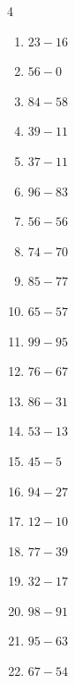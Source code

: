 \begin{multicols}{4}
\begin{enumerate}
  \item $23-16$
        \phantom{$=7$}

  \item $56-0$
        \phantom{$=56$}

  \item $84-58$
        \phantom{$=26$}

  \item $39-11$
        \phantom{$=28$}

  \item $37-11$
        \phantom{$=26$}

  \item $96-83$
        \phantom{$=13$}

  \item $56-56$
        \phantom{$=0$}

  \item $74-70$
        \phantom{$=4$}

  \item $85-77$
        \phantom{$=8$}

  \item $65-57$
        \phantom{$=8$}

  \item $99-95$
        \phantom{$=4$}

\columnbreak %

  \item $76-67$
        \phantom{$=9$}

  \item $86-31$
        \phantom{$=55$}

  \item $53-13$
        \phantom{$=40$}

  \item $45-5$
        \phantom{$=40$}

  \item $94-27$
        \phantom{$=67$}

  \item $12-10$
        \phantom{$=2$}

  \item $77-39$
        \phantom{$=38$}

  \item $32-17$
        \phantom{$=15$}

  \item $98-91$
        \phantom{$=7$}

  \item $95-63$
        \phantom{$=32$}

  \item $67-54$
        \phantom{$=13$}


\end{enumerate}
\end{multicols}
